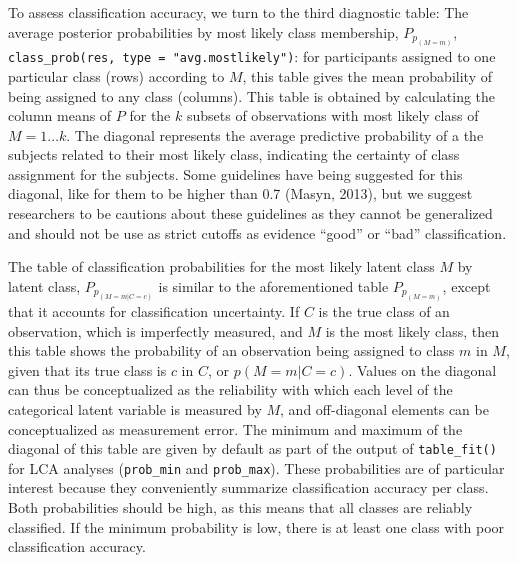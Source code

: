 \documentclass[
  ,man,floatsintext]{apa6}
\begin{document}
To assess classification accuracy, we turn to the third diagnostic table:
The average posterior probabilities by most likely class membership, \(P_{p_{(M = m)}}\), \texttt{class\_prob(res,\ type\ =\ "avg.mostlikely")}:
for participants assigned to one particular class (rows) according to \(M\),
this table gives the mean probability of being assigned to any class (columns).
This table is obtained by calculating the column means of \(P\) for the
\(k\) subsets of observations with most likely class of \(M = 1 \ldots k\).
The diagonal represents the average predictive probability of a the subjects related to their most likely class, indicating the certainty of class assignment for the subjects. Some guidelines have being suggested for this diagonal, like for them to be higher than 0.7 (Masyn, 2013), but we suggest researchers to be cautions about these guidelines as they cannot be generalized and should not be use as strict cutoffs as evidence ``good'' or ``bad'' classification.

The table of classification probabilities for the most likely latent class \(M\) by latent class, \(P_{p_{(M = m | C = c)}}\) is similar to the aforementioned table \(P_{p_{(M = m)}}\),
except that it accounts for classification uncertainty.
If \(C\) is the true class of an observation, which is imperfectly measured,
and \(M\) is the most likely class,
then this table shows the probability of an observation being assigned to class \(m\) in \(M\), given that its true class is \(c\) in \(C\), or \(p(M=m|C=c)\).
Values on the diagonal can thus be conceptualized as the reliability with which each level of the categorical latent variable is measured by \(M\),
and off-diagonal elements can be conceptualized as measurement error.
The minimum and maximum of the diagonal of this table are given by default as part of the output of \texttt{table\_fit()} for LCA analyses (\texttt{prob\_min} and \texttt{prob\_max}).
These probabilities are of particular interest because they conveniently summarize classification accuracy per class.
Both probabilities should be high, as this means that all classes are reliably classified.
If the minimum probability is low,
there is at least one class with poor classification accuracy.
\end{document}
